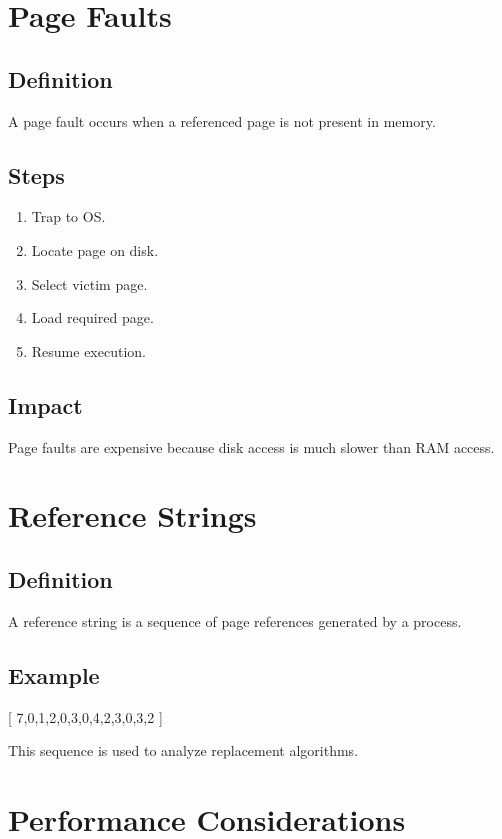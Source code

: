 \section{Page Faults}

\subsection{Definition}

A page fault occurs when a referenced page is not present in memory.

\subsection{Steps}

\begin{enumerate}
\item Trap to OS.
\item Locate page on disk.
\item Select victim page.
\item Load required page.
\item Resume execution.
\end{enumerate}

\subsection{Impact}

Page faults are expensive because disk access is much slower than RAM access.

\section{Reference Strings}

\subsection{Definition}

A reference string is a sequence of page references generated by a process.

\subsection{Example}

[
7,0,1,2,0,3,0,4,2,3,0,3,2
]

This sequence is used to analyze replacement algorithms.

\section{Performance Considerations}

